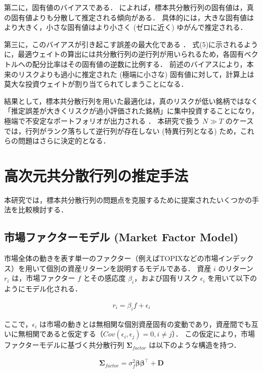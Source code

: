 \documentclass[lualatex,a4paper,11pt]{jlreq}
\begin{document}
第二に，固有値のバイアスである．\citet{Ledoit1995} によれば，標本共分散行列の固有値は，真の固有値よりも分散して推定される傾向がある．
具体的には，大きな固有値はより大きく，小さな固有値はより小さく (ゼロに近く) ゆがんで推定される．

第三に，このバイアスが引き起こす誤差の最大化である \citep{Michaud1989}．
式(5)に示されるように，最適ウェイトの算出には共分散行列の逆行列が用いられるため，各固有ベクトルへの配分比率はその固有値の逆数に比例する．
前述のバイアスにより，本来のリスクよりも過小に推定された (極端に小さな) 固有値に対して，計算上は莫大な投資ウェイトが割り当てられてしまうことになる．

結果として，標本共分散行列を用いた最適化は，真のリスクが低い銘柄ではなく「推定誤差が大きくリスクが過小評価された銘柄」に集中投資することになり，極端で不安定なポートフォリオが出力される \citep{DeNard2022}．
本研究で扱う $N \gg T$ のケースでは，行列がランク落ちして逆行列が存在しない (特異行列となる) ため，これらの問題はさらに決定的となる．  

\section{高次元共分散行列の推定手法}

本研究では，標本共分散行列の問題点を克服するために提案されたいくつかの手法を比較検討する．

\subsection{市場ファクターモデル (Market Factor Model)}
市場全体の動きを表す単一のファクター（例えばTOPIXなどの市場インデックス）を用いて個別の資産リターンを説明するモデルである．
資産 $i$ のリターン $r_i$ は，市場ファクター $f$ とその感応度 $\beta_i$，および固有リスク $\epsilon_i$ を用いて以下のようにモデル化される．

\begin{align}
    r_i = \beta_i f + \epsilon_i
\end{align}

ここで，$\epsilon_i$ は市場の動きとは無相関な個別資産固有の変動であり，資産間でも互いに無相関であると仮定する（$Cov(\epsilon_i, \epsilon_j) = 0, i \neq j$）．
この仮定により，市場ファクターモデルに基づく共分散行列 $\symbf{\Sigma}_{factor}$ は以下のような構造を持つ．

\begin{align}
    \symbf{\Sigma}_{factor} = \sigma_f^2 \symbf{\beta} \symbf{\beta}^\top + \symbf{D}
\end{align}
\end{document}
